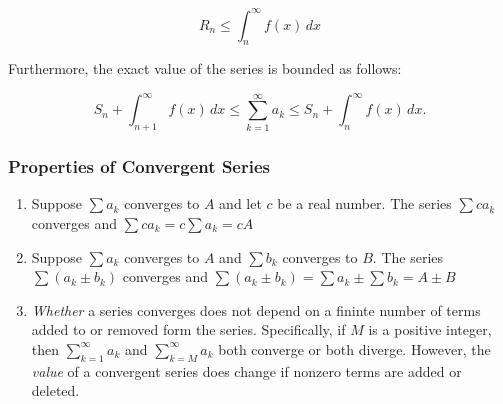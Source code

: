 \begin{equation}
    R_n \leq \int _{n} ^{\infty} f(x)\, dx
\end{equation}

Furthermore, the exact value of the series is bounded as follows:

\begin{equation}
    S_n + \int _{n + 1} ^{\infty} f(x)\, dx \leq \sum _{k = 1} ^{\infty} a_k \leq S_n + \int _{n} ^{\infty} f(x)\, dx.
\end{equation}

\subsubsection{Properties of Convergent Series}
\begin{enumerate}
    \item Suppose $\sum a_k$ converges to $A$ and let $c$ be a real number. The series $\sum c a_k$ converges and $\sum c a_k = c \sum a_k = cA$
    \item Suppose $\sum a_k$ converges to $A$ and $\sum b_k$ converges to $B$. The series $\sum (a_k \pm b_k)$ converges and $\sum (a_k \pm b_k) = \sum a_k \pm \sum b_k = A \pm B$
    \item \textit{Whether} a series converges does not depend on a fininte number of terms added to or removed form the series. Specifically, if $M$ is a positive integer, then $\sum _{k = 1} ^{\infty} a_k$ and $\sum _{k = M} ^{\infty} a_k$ both converge or both diverge. However, the \textit{value} of a convergent series does change if nonzero terms are added or deleted.
\end{enumerate}
